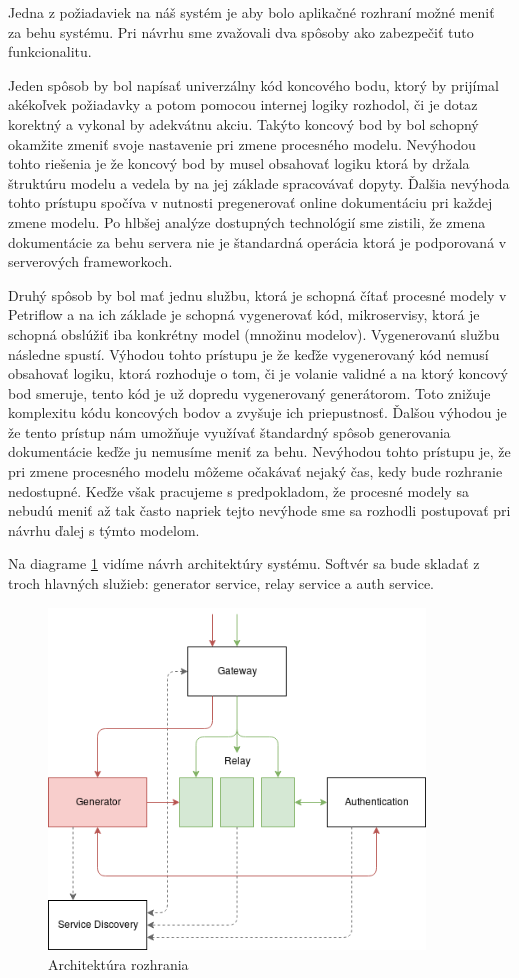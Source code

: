 Jedna z požiadaviek na náš systém je aby bolo aplikačné rozhraní možné meniť za behu systému. Pri návrhu sme zvažovali dva spôsoby ako zabezpečiť tuto funkcionalitu.

Jeden spôsob by bol napísať univerzálny kód koncového bodu, ktorý by prijímal  akékoľvek požiadavky a potom pomocou internej logiky rozhodol, či je dotaz korektný a vykonal by adekvátnu akciu.  Takýto koncový bod by bol schopný okamžite zmeniť svoje nastavenie pri zmene procesného modelu. Nevýhodou tohto riešenia je že koncový bod by musel obsahovať logiku ktorá by držala štruktúru modelu a vedela by na jej základe spracovávať dopyty. Ďalšia nevýhoda tohto prístupu spočíva v nutnosti pregenerovať online dokumentáciu pri každej zmene modelu. Po hlbšej analýze dostupných technológií sme zistili, že zmena dokumentácie za behu servera nie je štandardná operácia ktorá je podporovaná v serverových frameworkoch. 

Druhý spôsob by bol mať jednu službu, ktorá je schopná čítať procesné modely v Petriflow a na ich základe je schopná vygenerovať kód, mikroservisy, ktorá je schopná obslúžiť iba konkrétny model (množinu modelov).  Vygenerovanú službu následne spustí.
Výhodou tohto prístupu je že keďže vygenerovaný kód nemusí obsahovať logiku, ktorá rozhoduje o tom, či je volanie validné a na ktorý koncový bod smeruje, tento kód je už dopredu vygenerovaný generátorom. Toto znižuje komplexitu kódu koncových bodov a zvyšuje ich priepustnosť. Ďalšou výhodou je že tento prístup nám umožňuje využívať štandardný spôsob generovania dokumentácie keďže ju nemusíme meniť za behu. Nevýhodou tohto prístupu je, že pri zmene procesného modelu môžeme očakávať nejaký čas, kedy bude rozhranie nedostupné. Keďže však pracujeme s predpokladom, že procesné modely sa nebudú meniť až tak často napriek tejto nevýhode sme sa rozhodli postupovať pri návrhu ďalej s týmto modelom. 

Na diagrame \ref{architecture} vidíme návrh architektúry systému. Softvér sa bude skladať z troch hlavných služieb: generator service, relay service a auth service. 
\begin{figure}[!htbp]
	\centering
	\includegraphics[width=10cm]{img/architecture.png}
	\caption{Architektúra rozhrania}
	\label{architecture}
\end{figure}

